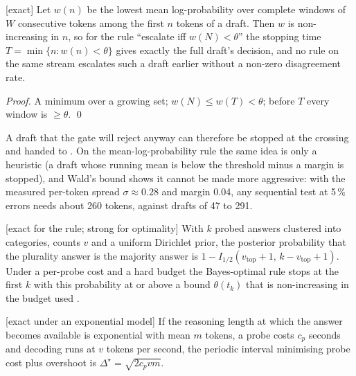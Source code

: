 \begin{proposition} \textnormal{[exact]}
\label{prop:n2}
Let $w(n)$ be the lowest mean log-probability over complete windows of $W$
consecutive tokens among the first $n$ tokens of a draft. Then $w$ is
non-increasing in $n$, so for the rule ``escalate iff $w(N)<\theta$'' the
stopping time $T=\min\{n:w(n)<\theta\}$ gives exactly the full draft's decision,
and no rule on the same stream escalates such a draft earlier without a
non-zero disagreement rate.
\end{proposition}
\begin{proof}
A minimum over a growing set; $w(N)\le w(T)<\theta$; before $T$ every window is
$\ge\theta$. \qed
\end{proof}
A draft that the gate will reject anyway can therefore be stopped at the
crossing and handed to \Stwo. On the mean-log-probability rule the same idea
is only a heuristic (a draft whose running mean is below the threshold minus a
margin is stopped), and Wald's bound shows it cannot be made more aggressive:
with the measured per-token spread $\sigma\approx0.28$ and margin 0.04, any
sequential test at 5\,\% errors needs about 260 tokens, against drafts of 47
to 291.

\begin{proposition} \textnormal{[exact for the rule; strong for optimality]}
\label{prop:n4}
With $k$ probed answers clustered into categories, counts $v$ and a uniform
Dirichlet prior, the posterior probability that the plurality answer is the
majority answer is
$1-I_{1/2}(v_{\mathrm{top}}+1,\,k-v_{\mathrm{top}}+1)$.
Under a per-probe cost and a hard budget the Bayes-optimal rule stops at the
first $k$ with this probability at or above a bound $\theta(t_k)$ that is
non-increasing in the budget used \cite{frazier2007deadline}.
\end{proposition}

\begin{proposition} \textnormal{[exact under an exponential model]}
\label{prop:n5}
If the reasoning length at which the answer becomes available is exponential
with mean $m$ tokens, a probe costs $c_p$ seconds and decoding runs at $v$
tokens per second, the periodic interval minimising probe cost plus overshoot is
$\Delta^\star=\sqrt{2c_pvm}$.
\end{proposition}

